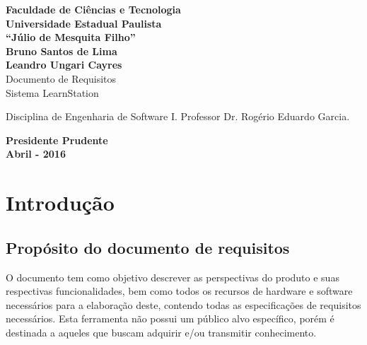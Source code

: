 \documentclass[12pt,a4paper,onecolumn,titlepage]{article}
\begin{document}

\begin{titlepage} %
	
	\vfill
	\begin{center}
	
		{\large \textbf{Faculdade de Ciências e Tecnologia\\Universidade Estadual Paulista\\``Júlio de Mesquita Filho''}} \\[3cm]
		{\large \textbf{Bruno Santos de Lima}}\\
		{\large \textbf{Leandro Ungari Cayres}}\\[4cm]
		{\Large Documento de Requisitos}\\
		{\Large Sistema LearnStation}\\[4cm]

	\hspace{.45\textwidth} %
	\begin{minipage}{.5\textwidth}
		\large Disciplina de Engenharia de Software I. Professor Dr. Rogério Eduardo Garcia.\\[0.5cm]
	\end{minipage}

	\vfill
	\vspace{1.5cm}
	
	\large \textbf{Presidente Prudente\\}
	\large \textbf{Abril - 2016}
	
	\end{center}
	
\end{titlepage}

\section{Introdução}
\label{sect:intro}

\subsection{Propósito do documento de requisitos}

O documento tem como objetivo descrever as perspectivas do produto e suas respectivas funcionalidades, bem como todos os recursos de hardware e software necessários para a elaboração deste, contendo todas as especificações de requisitos necessários. Esta ferramenta não possui um público alvo específico, porém é destinada a aqueles que buscam adquirir e/ou transmitir conhecimento.
\end{document}
